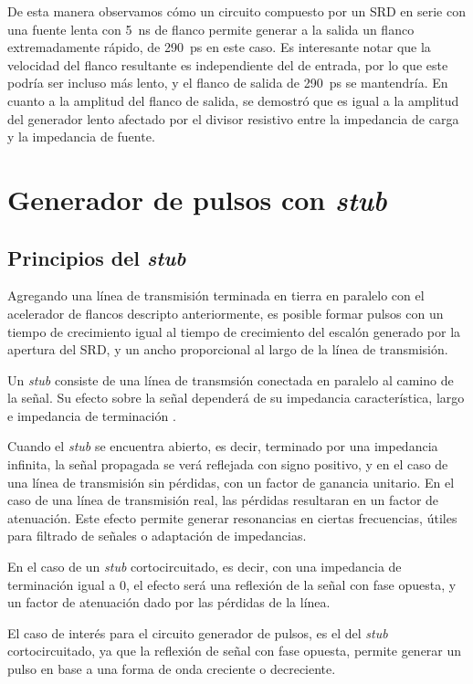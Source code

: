 De esta manera observamos cómo un circuito compuesto por un SRD en serie con una
fuente lenta con \qty{5}{\nano\second} de flanco permite generar a la salida un
flanco extremadamente rápido, de \qty{290}{\pico\second} en este caso. Es
interesante notar que la velocidad del flanco resultante es independiente del de
entrada, por lo que este podría ser incluso más lento, y el flanco de salida de
\qty{290}{\pico\second} se mantendría. En cuanto a la amplitud del flanco de
salida, se demostró que es igual a la amplitud del generador lento afectado por
el divisor resistivo entre la impedancia de carga y la impedancia de fuente.

\section{Generador de pulsos con \textit{stub}}
\label{sec:generador_pulsos_stub}

\subsection{Principios del \textit{stub}}

Agregando una línea de transmisión terminada en tierra en paralelo con el
acelerador de flancos descripto anteriormente, es posible formar pulsos con un
tiempo de crecimiento igual al tiempo de crecimiento del escalón generado por la
apertura del SRD, y un ancho proporcional al largo de la línea de transmisión.

Un \textit{stub} consiste de una línea de transmsión conectada en paralelo al
camino de la señal. Su efecto sobre la señal dependerá de su impedancia
característica, largo e impedancia de terminación \cite{pozar2011}.

Cuando el \textit{stub} se encuentra abierto, es decir, terminado por una
impedancia infinita, la señal propagada se verá reflejada con signo positivo, y
en el caso de una línea de transmisión sin pérdidas, con un factor de ganancia
unitario. En el caso de una línea de transmisión real, las pérdidas resultaran
en un factor de atenuación. Este efecto permite generar
resonancias en ciertas frecuencias, útiles para filtrado de señales o adaptación
de impedancias.

En el caso de un \textit{stub} cortocircuitado, es decir, con una impedancia de
terminación igual a $0$, el efecto será una reflexión de la señal con fase
opuesta, y un factor de atenuación dado por las pérdidas de la línea.

El caso de interés para el circuito generador de pulsos, es el del \textit{stub}
cortocircuitado, ya que la reflexión de señal con fase opuesta, permite generar
un pulso en base a una forma de onda creciente o decreciente.

